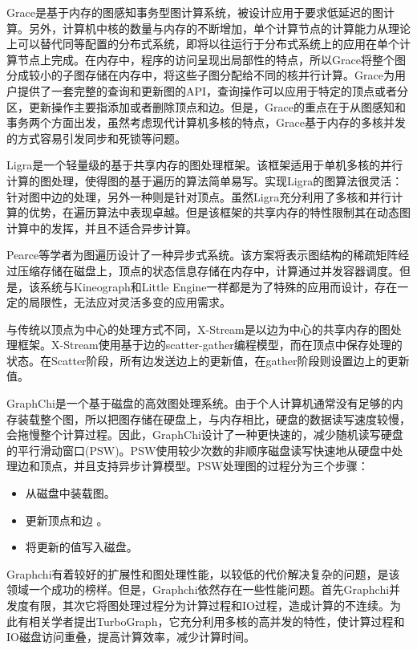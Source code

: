 Grace\cite{prabhakaran2012managing}是基于内存的图感知事务型图计算系统，被设计应用于要求低延迟的图计算。另外，计算机中核的数量与内存的不断增加，单个计算节点的计算能力从理论上可以替代同等配置的分布式系统，即将以往运行于分布式系统上的应用在单个计算节点上完成。在内存中，程序的访问呈现出局部性的特点，所以Grace将整个图分成较小的子图存储在内存中，将这些子图分配给不同的核并行计算。Grace为用户提供了一套完整的查询和更新图的API，查询操作可以应用于特定的顶点或者分区，更新操作主要指添加或者删除顶点和边。但是，Grace的重点在于从图感知和事务两个方面出发，虽然考虑现代计算机多核的特点，Grace基于内存的多核并发的方式容易引发同步和死锁等问题。

Ligra\cite{shun2013ligra}是一个轻量级的基于共享内存的图处理框架。该框架适用于单机多核的并行计算的图处理，使得图的基于遍历的算法简单易写。实现Ligra的图算法很灵活：针对图中边的处理，另外一种则是针对顶点。虽然Ligra充分利用了多核和并行计算的优势，在遍历算法中表现卓越。但是该框架的共享内存的特性限制其在动态图计算中的发挥，并且不适合异步计算。

Pearce\cite{pearce2010multithreaded}等学者为图遍历设计了一种异步式系统。该方案将表示图结构的稀疏矩阵经过压缩存储在磁盘上，顶点的状态信息存储在内存中，计算通过并发容器调度。但是，该系统与Kineograph和Little Engine一样都是为了特殊的应用而设计，存在一定的局限性，无法应对灵活多变的应用需求。

与传统以顶点为中心的处理方式不同，X-Stream\cite{roy2013x}是以边为中心的共享内存的图处理框架。X-Stream\cite{roy2013x}使用基于边的scatter-gather编程模型，而在顶点中保存处理的状态。在Scatter阶段，所有边发送边上的更新值，在gather阶段则设置边上的更新值。

GraphChi\cite{kyrola2012graphchi}是一个基于磁盘的高效图处理系统。由于个人计算机通常没有足够的内存装载整个图，所以把图存储在硬盘上，与内存相比，硬盘的数据读写速度较慢，会拖慢整个计算过程。因此，GraphChi设计了一种更快速的，减少随机读写硬盘的平行滑动窗口(PSW)。PSW使用较少次数的非顺序磁盘读写快速地从硬盘中处理边和顶点，并且支持异步计算模型。PSW处理图的过程分为三个步骤：
\begin{itemize}
\item 从磁盘中装载图。
\item 更新顶点和边 。
\item 将更新的值写入磁盘。
\end{itemize}
Graphchi有着较好的扩展性和图处理性能，以较低的代价解决复杂的问题，是该领域一个成功的榜样。但是，Graphchi依然存在一些性能问题。首先Graphchi并发度有限，其次它将图处理过程分为计算过程和IO过程，造成计算的不连续。为此有相关学者提出TurboGraph，它充分利用多核的高并发的特性，使计算过程和IO磁盘访问重叠，提高计算效率，减少计算时间。

